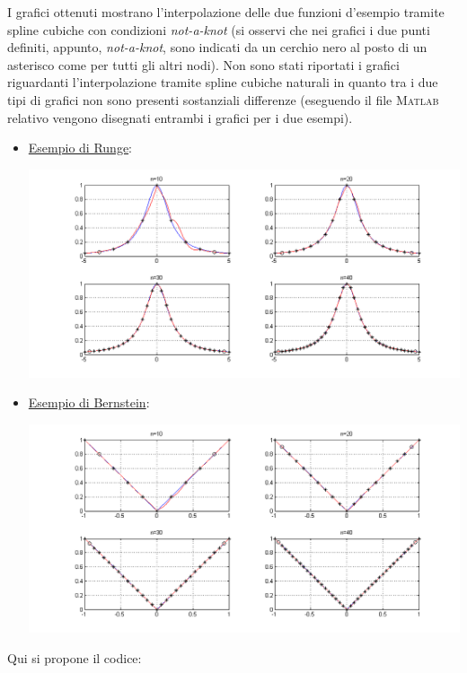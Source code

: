 \begin{sol}
	I grafici ottenuti mostrano l'interpolazione delle due funzioni d'esempio tramite spline cubiche con condizioni \textit{not-a-knot} (si osservi che nei grafici i due punti definiti, appunto, \textit{not-a-knot}, sono indicati da un cerchio nero al posto di un asterisco come per tutti gli altri nodi). Non sono stati riportati i grafici riguardanti l'interpolazione tramite spline cubiche naturali in quanto tra i due tipi di grafici non sono presenti sostanziali differenze (eseguendo il file \textsc{Matlab} relativo vengono disegnati entrambi i grafici per i due esempi).
	\begin{itemize}
		\item \underline{Esempio di Runge}:
			\begin{center}
				\includegraphics[scale=0.4]{img/es4_20a.png}
			\end{center}
		\item \underline{Esempio di Bernstein}:
			\begin{center}
				\includegraphics[scale=0.4]{img/es4_20b.png}
			\end{center}
	\end{itemize}
	Qui si propone il codice:\\
	
\end{sol}

